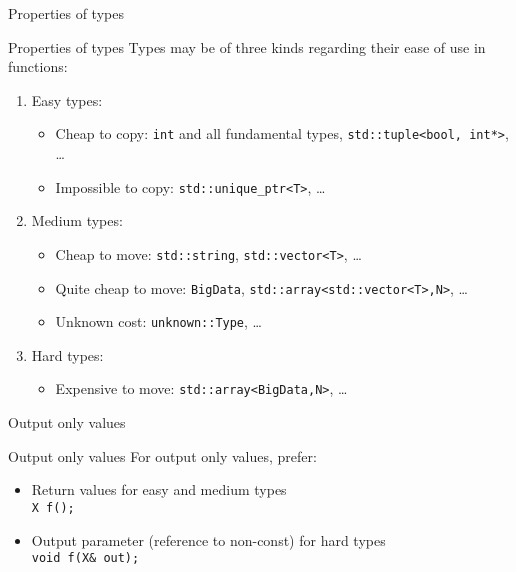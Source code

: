 
\begin{frame}{Properties of types}{}
  \begin{block}{Properties of types}
    Types may be of three kinds regarding their ease of use in functions:
    \begin{enumerate}
    \item
      Easy types:
      \begin{itemize}
      \item
        Cheap to copy: \lstinline!int! and all fundamental types, \lstinline!std::tuple<bool, int*>!, \ldots
      \item
        Impossible to copy: \lstinline!std::unique_ptr<T>!, \ldots
      \end{itemize}
    \item
      Medium types:
      \begin{itemize}
      \item
        Cheap to move: \lstinline!std::string!, \lstinline!std::vector<T>!, \ldots
      \item
        Quite cheap to move: \lstinline!BigData!, \lstinline!std::array<std::vector<T>,N>!, \ldots
      \item
        Unknown cost: \lstinline!unknown::Type!, \ldots
      \end{itemize}
    \item
      Hard types:
      \begin{itemize}
      \item
        Expensive to move: \lstinline!std::array<BigData,N>!, \ldots
      \end{itemize}
    \end{enumerate}
  \end{block}
\end{frame}

\begin{frame}{Output only values}{}
  \begin{block}{Output only values}
    For output only values, prefer:
    \begin{itemize}
    \item
      Return values for easy and medium types \\
      \lstinline!X f();!
    \item
      Output parameter (reference to non-const) for hard types \\
      \lstinline!void f(X& out);!
    \end{itemize}
  \end{block}

  \begin{example}
  \end{example}
\end{frame}

